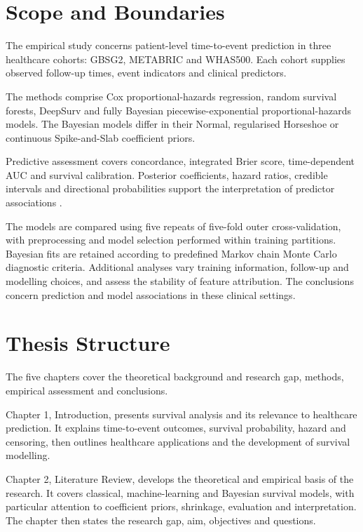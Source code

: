 \section{Scope and Boundaries}\label{scope-and-boundaries}

The empirical study concerns patient-level time-to-event prediction in three healthcare cohorts: GBSG2, METABRIC and WHAS500. Each cohort supplies observed follow-up times, event indicators and clinical predictors.

The methods comprise Cox proportional-hazards regression, random survival forests, DeepSurv and fully Bayesian piecewise-exponential proportional-hazards models. The Bayesian models differ in their Normal, regularised Horseshoe or continuous Spike-and-Slab coefficient priors.

Predictive assessment covers concordance, integrated Brier score, time-dependent AUC and survival calibration. Posterior coefficients, hazard ratios, credible intervals and directional probabilities support the interpretation of predictor associations \cite{ref22}.

The models are compared using five repeats of five-fold outer cross-validation, with preprocessing and model selection performed within training partitions. Bayesian fits are retained according to predefined Markov chain Monte Carlo diagnostic criteria. Additional analyses vary training information, follow-up and modelling choices, and assess the stability of feature attribution. The conclusions concern prediction and model associations in these clinical settings.

\section{Thesis Structure}\label{thesis-structure}

The five chapters cover the theoretical background and research gap, methods, empirical assessment and conclusions.

Chapter 1, Introduction, presents survival analysis and its relevance to healthcare prediction. It explains time-to-event outcomes, survival probability, hazard and censoring, then outlines healthcare applications and the development of survival modelling.

Chapter 2, Literature Review, develops the theoretical and empirical basis of the research. It covers classical, machine-learning and Bayesian survival models, with particular attention to coefficient priors, shrinkage, evaluation and interpretation. The chapter then states the research gap, aim, objectives and questions.

